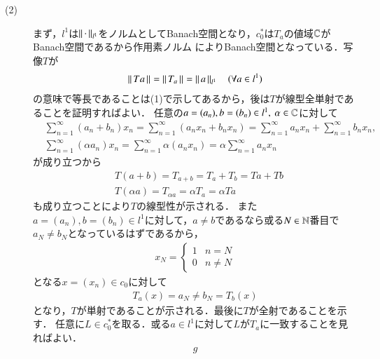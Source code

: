 \begin{prf}
\begin{description}
	\item[(2)] まず，$l^1$は$\left\|\, \cdot\, \right\|_{l^1}$をノルムとしてBanach空間となり，$c_0^*$は$T_a$の値域$\mathbb{C}$がBanach空間であるから作用素ノルム
		によりBanach空間となっている．写像$T$が
		\begin{align}
			\left\|\, Ta\, \right\|_{} = \left\|\, T_a\, \right\|_{} = \left\|\, a\, \right\|_{l^1}\quad (\forall a \in l^1)
		\end{align}
		の意味で等長であることは(1)で示してあるから，後は$T$が線型全単射であることを証明すればよい．
		任意の$a = (a_n), b=(b_n) \in l^1,\ \alpha \in \mathbb{C}$に対して
		\begin{align}
			&\sum_{n=1}^{\infty} (a_n + b_n) x_n 
			= \sum_{n=1}^{\infty} (a_n x_n + b_n x_n) 
			=  \sum_{n=1}^{\infty} a_n x_n + \sum_{n=1}^{\infty} b_n x_n, \\
			&\sum_{n=1}^{\infty} (\alpha a_n) x_n
			= \sum_{n=1}^{\infty} \alpha (a_n x_n)
			= \alpha \sum_{n=1}^{\infty} a_n x_n
		\end{align}
		が成り立つから
		\begin{align}
			&T(a+b) = T_{a+b} = T_a + T_b = Ta + Tb \\
			&T(\alpha a) = T_{\alpha a} = \alpha T_a = \alpha Ta
		\end{align}
		も成り立つことにより$T$の線型性が示される．
		また$a = (a_n), b=(b_n) \in l^1$に対して，$a \neq b$であるなら或る$N \in \mathbb{N}$番目で
		$a_N \neq b_N$となっているはずであるから，
		\begin{align}
			x_N = \begin{cases}
				1 & n=N \\
				0 & n \neq N
			\end{cases}
		\end{align}
		となる$x=(x_n) \in c_0$に対して
		\begin{align}
			T_a(x) = a_N \neq b_N = T_b(x)
		\end{align}
		となり，$T$が単射であることが示される．最後に$T$が全射であることを示す．
		任意に$L \in c_0^*$を取る．或る$a \in l^1$に対して$L$が$T_a$に一致することを見ればよい．
		\begin{align}
			g
		\end{align}
\end{description}
\end{prf}







